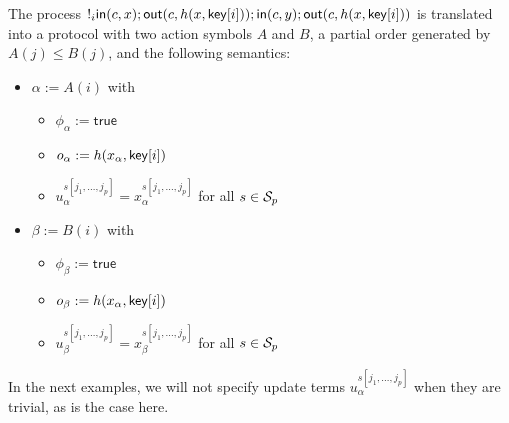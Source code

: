 \begin{example}
  The process $!_i
  \mathsf{in}(c,x);\mathsf{out}(c,h(x,\mathsf{key}[i]));\mathsf{in}(c,y);\mathsf{out}(c,h(x,\mathsf{key}[i]))$
  is translated into a protocol with two action symbols $A$ and $B$,
  a partial order generated by $A(j) \leq B(j)$, and the following
  semantics:
  \begin{itemize}
    \item $\alpha := A(i)$ with
      \begin{itemize}
        \item $\phi_\alpha := \mathsf{true}$
        \item $o_\alpha := h(x_\alpha,\mathsf{key}[i])$
        \item $u_\alpha^{s[j_1,\ldots,j_p]} = x_\alpha^{s[j_1,\ldots,j_p]}$
          for all $s\in\mathcal{S}_p$
      \end{itemize}
    \item $\beta := B(i)$ with
      \begin{itemize}
        \item $\phi_\beta := \mathsf{true}$
        \item $o_\beta := h(x_\alpha,\mathsf{key}[i])$
        \item $u_\beta^{s[j_1,\ldots,j_p]} = x_\beta^{s[j_1,\ldots,j_p]}$
          for all $s\in\mathcal{S}_p$
      \end{itemize}
  \end{itemize}
  In the next examples, we will not specify update terms
  $u_\alpha^{s[j_1,\ldots,j_p]}$ when they are trivial, as is the case
  here.
\end{example}

